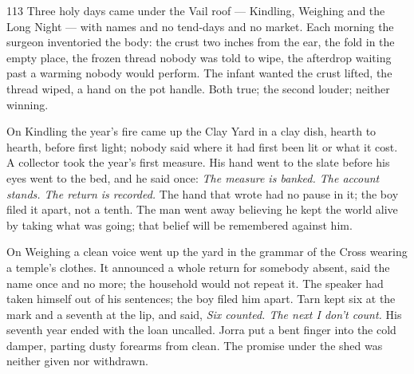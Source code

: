 
\scenebreak


\scenebreak


\scenebreak

\CRtailpiece
\begin{CRchronicle}{113}
Three holy days came under the Vail roof — Kindling, Weighing and the Long Night — with names and no tend-days and no market. Each morning the surgeon inventoried the body: the crust two inches from the ear, the fold in the empty place, the frozen thread nobody was told to wipe, the afterdrop waiting past a warming nobody would perform. The infant wanted the crust lifted, the thread wiped, a hand on the pot handle. Both true; the second louder; neither winning.

On Kindling the year’s fire came up the Clay Yard in a clay dish, hearth to hearth, before first light; nobody said where it had first been lit or what it cost. A collector took the year’s first measure. His hand went to the slate before his eyes went to the bed, and he said once: \emph{The measure is banked. The account stands. The return is recorded.} The hand that wrote had no pause in it; the boy filed it apart, not a tenth. The man went away believing he kept the world alive by taking what was going; that belief will be remembered against him.

On Weighing a clean voice went up the yard in the grammar of the Cross wearing a temple’s clothes. It announced a whole return for somebody absent, said the name once and no more; the household would not repeat it. The speaker had taken himself out of his sentences; the boy filed him apart. Tarn kept six at the mark and a seventh at the lip, and said, \emph{Six counted. The next I don’t count.} His seventh year ended with the loan uncalled. Jorra put a bent finger into the cold damper, parting dusty forearms from clean. The promise under the shed was neither given nor withdrawn.


\end{CRchronicle}
